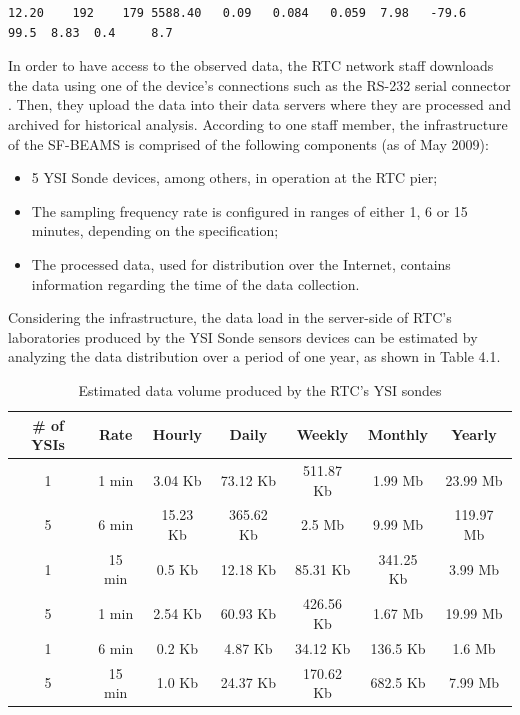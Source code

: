 \lstset{label=data:ysi-stream,caption=The Collected Data Stream from the
YSI Sonde 6600ESDV2}
\begin{lstlisting}
12.20    192    179 5588.40   0.09   0.084   0.059  7.98   -79.6   99.5  8.83  0.4     8.7
\end{lstlisting}

In order to have access to the observed data, the RTC network staff downloads
the data using one of the device's connections such as the RS-232 serial connector
\cite{rs232}. Then, they upload the data into their data servers where they are
processed and archived for historical analysis. According to one
staff member, the infrastructure of the SF-BEAMS is comprised of the 
following components (as of May 2009):

\begin{itemize}
  \item 5 YSI Sonde devices, among others, in operation at the RTC pier;
  \item The sampling frequency rate is configured in ranges of either 1, 6 or
  15 minutes, depending on the specification;
  \item The processed data, used for distribution over the Internet,
   contains information regarding the time of the data collection.
\end{itemize}

Considering the infrastructure, the data load in the server-side
of RTC's laboratories produced by the YSI Sonde sensors devices can be
estimated by analyzing the data distribution over a period of one year, as
shown in Table 4.1.

\begin{table}[!h]
    \label{tab:year-data-distribution}
     \begin{center}
      \begin{tabular}{|c|c|c|c|c|c|c|}\hline 
        \textbf{\# of YSIs} & \textbf{Rate} & \textbf{Hourly} &
        \textbf{Daily} & \textbf{Weekly} & \textbf{Monthly} & \textbf{Yearly}\\\hline 
        1 & 1 min & 3.04 Kb & 73.12 Kb & 511.87 Kb & 1.99 Mb & 23.99 Mb\\\hline 
        5 & 6 min & 15.23 Kb & 365.62 Kb & 2.5 Mb & 9.99 Mb & 119.97 Mb\\\hline 
        1 & 15 min & 0.5 Kb & 12.18 Kb & 85.31 Kb & 341.25 Kb & 3.99 Mb\\\hline 
        5 & 1 min & 2.54 Kb & 60.93 Kb & 426.56 Kb & 1.67 Mb & 19.99 Mb\\\hline
        1 & 6 min & 0.2 Kb & 4.87 Kb & 34.12 Kb & 136.5 Kb & 1.6 Mb\\\hline 
        5 & 15 min & 1.0 Kb & 24.37 Kb & 170.62 Kb & 682.5 Kb & 7.99 Mb\\\hline
        \end{tabular}
        \caption{Estimated data volume produced by the RTC's YSI sondes}
      \end{center}
\end{table}

